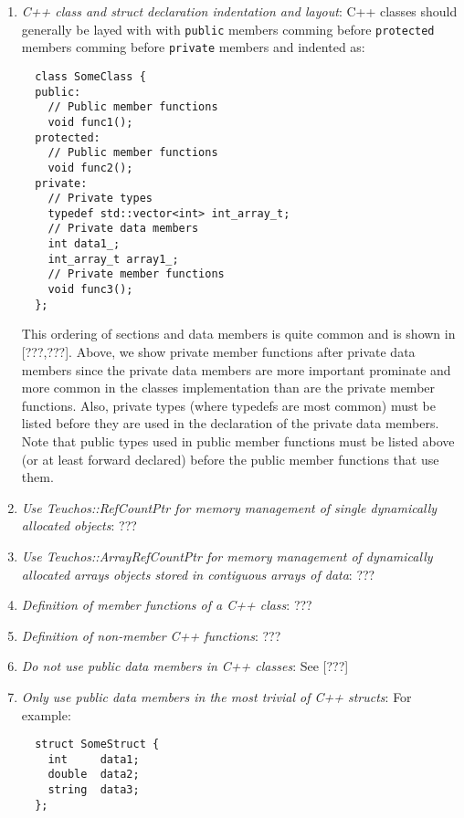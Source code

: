 \begin{enumerate}

{}\item\textit{C++ class and struct declaration indentation and layout}: C++
classes should generally be layed with with {}\texttt{public} members comming
before {}\texttt{protected} members comming before {}\texttt{private} members
and indented as:

\begin{verbatim}
  class SomeClass {
  public:
    // Public member functions
    void func1();
  protected:
    // Public member functions
    void func2();
  private:
    // Private types
    typedef std::vector<int> int_array_t;
    // Private data members
    int data1_;
    int_array_t array1_;
    // Private member functions
    void func3();
  };
\end{verbatim}

This ordering of sections and data members is quite common and is shown in
[???,???].  Above, we show private member functions after private data members
since the private data members are more important prominate and more common in
the classes implementation than are the private member functions.  Also,
private types (where typedefs are most common) must be listed before they are
used in the declaration of the private data members.  Note that public types
used in public member functions must be listed above (or at least forward
declared) before the public member functions that use them.

{}\item\textit{Use Teuchos::RefCountPtr for memory management of single
dynamically allocated objects}: ???

{}\item\textit{Use Teuchos::ArrayRefCountPtr for memory management of
dynamically allocated arrays objects stored in contiguous arrays of data}: ???

{}\item\textit{Definition of member functions of a C++ class}: ???

{}\item\textit{Definition of non-member C++ functions}: ???

{}\item\textit{Do not use public data members in C++ classes}: See [???]

{}\item\textit{Only use public data members in the most trivial of C++
structs}: For example:

\begin{verbatim}
  struct SomeStruct {
    int     data1;
    double  data2;
    string  data3;
  };
\end{verbatim}


\end{enumerate}
